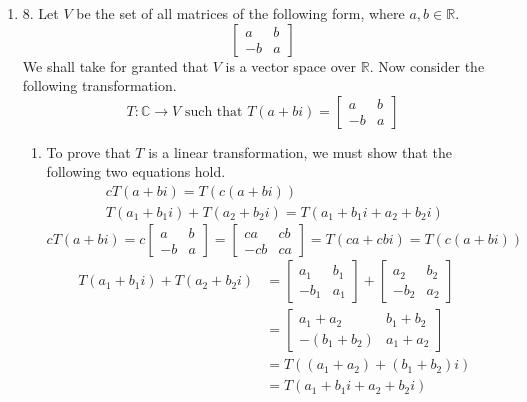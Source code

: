 \documentclass{article}
\newenvironment{answers}{ %
	\begin{enumerate}
		\setlength{\itemsep}{\bigskipamount}
}{\end{enumerate}}
\newcommand{\R}{\mathbb{R}}
\newcommand{\C}{\mathbb{C}}
\newcommand{\st}{\text{ such that }}
\begin{document}
\begin{answers}
	\item[8.]
		Let \(V\) be the set of all matrices of the following form, where \(a,b \in \R\).
		\begin{equation*}
			\left[ \begin{matrix}
					a & b \\ -b & a
				\end{matrix} \right]
		\end{equation*}
		We shall take for granted that \(V\) is a vector space over \(\R\). Now consider the following transformation.
		\begin{equation*}
			T : \C \to V \st T(a + bi) = \left[ \begin{matrix} a & b \\ -b & a \end{matrix} \right]
		\end{equation*}
		\begin{enumerate}
			\item
				To prove that \(T\) is a linear transformation, we must show that the following two equations hold.
				\begin{gather*}
					cT(a+bi) = T(c(a+bi)) \\
					T(a_1 + b_1i) + T(a_2 + b_2i) = T(a_1 + b_1i + a_2 + b_2i)
				\end{gather*}
				\begin{equation*}
					cT(a+bi) = c \left[ \begin{matrix} a & b \\ -b & a \end{matrix} \right] = \left[ \begin{matrix} ca & cb \\ -cb & ca \end{matrix} \right] = T(ca + cbi) = T(c(a+bi))
				\end{equation*}
				\begin{align*}
					T(a_1 + b_1i) + T(a_2 + b_2i) & = \left[ \begin{matrix} a_1 & b_1 \\ -b_1 & a_1 \end{matrix} \right] + \left[ \begin{matrix} a_2 & b_2 \\ -b_2 & a_2 \end{matrix} \right] \\
					                              & = \left[ \begin{matrix} a_1+a_2 & b_1+b_2 \\ -(b_1+b_2) & a_1+a_2 \end{matrix} \right] \\
					                              & = T((a_1 + a_2) + (b_1 + b_2)i) \\
					                              & = T(a_1 + b_1i + a_2 + b_2i)
				\end{align*}


\end{enumerate}
\end{answers}
\end{document}
